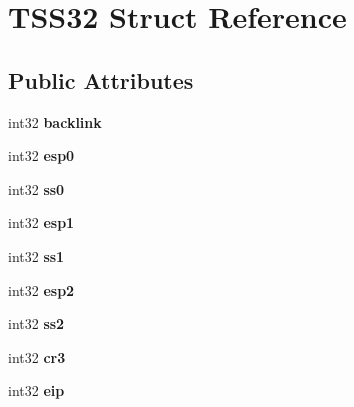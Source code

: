 \hypertarget{struct_t_s_s32}{}\section{T\+S\+S32 Struct Reference}
\label{struct_t_s_s32}
\subsection*{Public Attributes}
\begin{DoxyCompactItemize}
\item 
\hypertarget{struct_t_s_s32_adfed9980715884f5a598340b83a24f31}{}int32 {\bfseries backlink}\label{struct_t_s_s32_adfed9980715884f5a598340b83a24f31}

\item 
\hypertarget{struct_t_s_s32_aaa757d2b305d9a42c56292c59c6b9f03}{}int32 {\bfseries esp0}\label{struct_t_s_s32_aaa757d2b305d9a42c56292c59c6b9f03}

\item 
\hypertarget{struct_t_s_s32_a8f39ddf0a02a38cda075f906d43fb2cd}{}int32 {\bfseries ss0}\label{struct_t_s_s32_a8f39ddf0a02a38cda075f906d43fb2cd}

\item 
\hypertarget{struct_t_s_s32_af781f1d6164ead56e1998dc838afd709}{}int32 {\bfseries esp1}\label{struct_t_s_s32_af781f1d6164ead56e1998dc838afd709}

\item 
\hypertarget{struct_t_s_s32_a349136f37bc73578afec3601df0790c7}{}int32 {\bfseries ss1}\label{struct_t_s_s32_a349136f37bc73578afec3601df0790c7}

\item 
\hypertarget{struct_t_s_s32_a3d634d5b25537d9c6b9b418cb01cfcc5}{}int32 {\bfseries esp2}\label{struct_t_s_s32_a3d634d5b25537d9c6b9b418cb01cfcc5}

\item 
\hypertarget{struct_t_s_s32_a33849f7ed97301dd72c08cb377449f57}{}int32 {\bfseries ss2}\label{struct_t_s_s32_a33849f7ed97301dd72c08cb377449f57}

\item 
\hypertarget{struct_t_s_s32_af225c0a0fcb7b622219483e3552d1c95}{}int32 {\bfseries cr3}\label{struct_t_s_s32_af225c0a0fcb7b622219483e3552d1c95}

\item 
\hypertarget{struct_t_s_s32_a343d00875941c409462e3264c63a6a9b}{}int32 {\bfseries eip}\label{struct_t_s_s32_a343d00875941c409462e3264c63a6a9b}


\end{DoxyCompactItemize}
